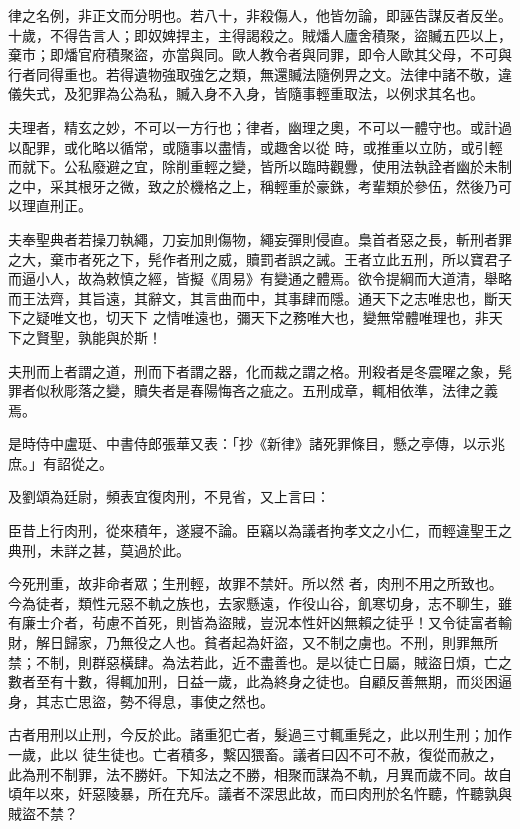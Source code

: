 \begin{pinyinscope}
 律之名例，非正文而分明也。若八十，非殺傷人，他皆勿論，即誣告謀反者反坐。十歲，不得告言人；即奴婢捍主，主得謁殺之。賊燔人廬舍積聚，盜贓五匹以上，棄市；即燔官府積聚盜，亦當與同。歐人教令者與同罪，即令人歐其父母，不可與行者同得重也。若得遺物強取強乞之類，無還贓法隨例畀之文。法律中諸不敬，違儀失式，及犯罪為公為私，贓入身不入身，皆隨事輕重取法，以例求其名也。



 夫理者，精玄之妙，不可以一方行也；律者，幽理之奧，不可以一體守也。或計過以配罪，或化略以循常，或隨事以盡情，或趣舍以從
 時，或推重以立防，或引輕而就下。公私廢避之宜，除削重輕之變，皆所以臨時觀釁，使用法執詮者幽於未制之中，采其根牙之微，致之於機格之上，稱輕重於豪銖，考輩類於參伍，然後乃可以理直刑正。



 夫奉聖典者若操刀執繩，刀妄加則傷物，繩妄彈則侵直。梟首者惡之長，斬刑者罪之大，棄市者死之下，髡作者刑之威，贖罰者誤之誡。王者立此五刑，所以寶君子而逼小人，故為敕慎之經，皆擬《周易》有變通之體焉。欲令提綱而大道清，舉略而王法齊，其旨遠，其辭文，其言曲而中，其事肆而隱。通天下之志唯忠也，斷天下之疑唯文也，切天下
 之情唯遠也，彌天下之務唯大也，變無常體唯理也，非天下之賢聖，孰能與於斯！



 夫刑而上者謂之道，刑而下者謂之器，化而裁之謂之格。刑殺者是冬震曜之象，髡罪者似秋彫落之變，贖失者是春陽悔吝之疵之。五刑成章，輒相依準，法律之義焉。



 是時侍中盧珽、中書侍郎張華又表：「抄《新律》諸死罪條目，懸之亭傳，以示兆庶。」有詔從之。



 及劉頌為廷尉，頻表宜復肉刑，不見省，又上言曰：



 臣昔上行肉刑，從來積年，遂寢不論。臣竊以為議者拘孝文之小仁，而輕違聖王之典刑，未詳之甚，莫過於此。



 今死刑重，故非命者眾；生刑輕，故罪不禁奸。所以然
 者，肉刑不用之所致也。今為徒者，類性元惡不軌之族也，去家懸遠，作役山谷，飢寒切身，志不聊生，雖有廉士介者，茍慮不首死，則皆為盜賊，豈況本性奸凶無賴之徒乎！又令徒富者輸財，解日歸家，乃無役之人也。貧者起為奸盜，又不制之虜也。不刑，則罪無所禁；不制，則群惡橫肆。為法若此，近不盡善也。是以徒亡日屬，賊盜日煩，亡之數者至有十數，得輒加刑，日益一歲，此為終身之徒也。自顧反善無期，而災困逼身，其志亡思盜，勢不得息，事使之然也。



 古者用刑以止刑，今反於此。諸重犯亡者，髮過三寸輒重髡之，此以刑生刑；加作一歲，此以
 徒生徒也。亡者積多，繫囚猥畜。議者曰囚不可不赦，復從而赦之，此為刑不制罪，法不勝奸。下知法之不勝，相聚而謀為不軌，月異而歲不同。故自頃年以來，奸惡陵暴，所在充斥。議者不深思此故，而曰肉刑於名忤聽，忤聽孰與賊盜不禁？




\end{pinyinscope}
